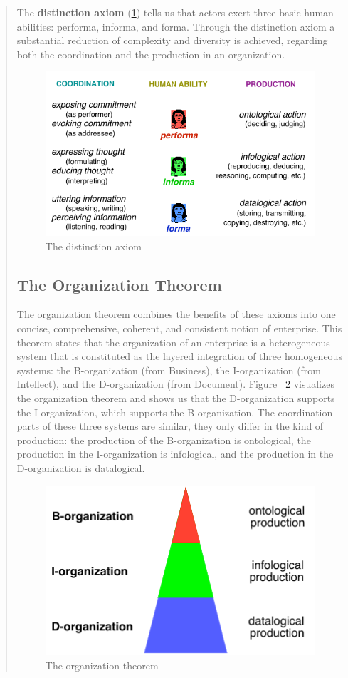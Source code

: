 \begin{quotation}
The \textbf{distinction axiom} (\cref{fig:DisctinctionAxiom}) tells us that actors exert three basic human abilities: performa, informa, and forma. Through the distinction axiom a substantial reduction of complexity and diversity is achieved, regarding both the coordination and the production in an organization.

\begin{figure}[ht!]
	\centering
    \includegraphics[width=10cm, keepaspectratio]{img/DistinctionAxiom}
    \caption{The distinction axiom}
    \label{fig:DisctinctionAxiom}
\end{figure}

\subsection{The Organization Theorem}

The organization theorem combines the benefits of these axioms into one concise, comprehensive, coherent, and consistent notion of enterprise. This theorem states that the organization of an enterprise is a heterogeneous system that is constituted as the layered integration of three homogeneous systems: the B-organization (from Business), the I-organization (from Intellect), and the D-organization (from Document). Figure~ \ref{fig:OrganizationPyramid} visualizes the organization theorem and shows us that the D-organization supports the I-organization, which supports the B-organization. The coordination parts of these three systems are similar, they only differ in the kind of production: the production of the B-organization is ontological, the production in the I-organization is infological, and the production in the D-organization is datalogical.

\begin{figure}[ht!]
	\centering
    \includegraphics[width=10cm, keepaspectratio]{img/OrganizationPyramid}
    \caption{The organization theorem}
    \label{fig:OrganizationPyramid}
\end{figure}


\end{quotation}

